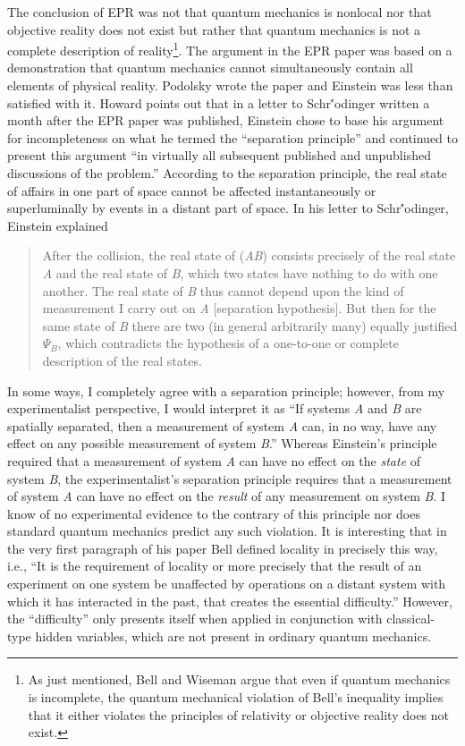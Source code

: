 \documentclass[12pt]{article}
\begin{document}
The conclusion of EPR was not that quantum mechanics is nonlocal nor that objective reality does not exist but rather that quantum mechanics is not a complete description of reality\footnote{ As just mentioned, Bell and Wiseman argue that even if quantum mechanics is incomplete, the quantum mechanical violation of Bell's inequality implies that it either violates the principles of relativity or objective reality does not exist.}. The argument in the EPR paper was based on a demonstration that quantum mechanics cannot simultaneously contain all elements of physical reality. Podolsky wrote the paper and Einstein was less than satisfied with it. Howard\cite{How07} points out that in a letter to Schr\''{o}dinger written a month after the EPR paper was published, Einstein chose to base his argument for incompleteness on what he termed the ``separation principle'' and continued to present this argument ``in virtually all subsequent published and
unpublished discussions of the problem.''\cite{How07}  According to the separation principle, the real state of affairs in one part of space cannot be affected instantaneously or superluminally by events in a distant part of space. In his letter to Schr\''{o}dinger, Einstein explained\cite{How07}
\begin{quote}
After the collision, the real state of ({\it AB}) consists precisely of the real state {\it A} and the real state of {\it B}, which two states have nothing to do with one another. The real state of {\it B} thus cannot depend upon the kind of measurement I carry out on {\it A} [separation hypothesis]. But then for the same state of {\it B} there are two (in general arbitrarily many) equally justified $\Psi_B$, which contradicts the hypothesis of a one-to-one or complete description of the real states.
\end{quote}

In some ways, I completely agree with a separation principle; however, from my experimentalist perspective, I would interpret it as ``If systems {\it A} and {\it B} are spatially separated, then a measurement of system {\it A} can, in no way, have any effect on any possible measurement of system {\it B}.'' Whereas Einstein's principle required that a measurement of system {\it A} can have no effect on the {\it state} of system {\it B}, the experimentalist's separation principle requires that a measurement of system {\it A} can have no effect on the {\it result} of any measurement on system {\it B}.  I know of no experimental evidence to the contrary of this principle nor does standard quantum mechanics predict any such violation. It is interesting that in the very first paragraph of his paper Bell defined locality in precisely this way, i.e., ``It is the requirement of locality or more precisely that the result of an experiment on one system be unaffected by operations on a distant system with which it has interacted in the past, that creates the essential difficulty.''\cite{Bel64} However, the ``difficulty'' only presents itself when applied in conjunction with classical-type hidden variables, which are not present in ordinary quantum mechanics.
\end{document}

